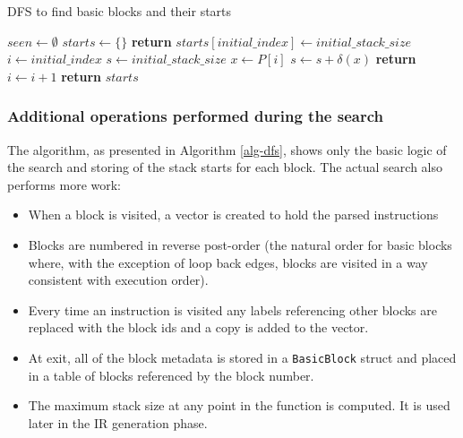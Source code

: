 \begin{algorithm}
      \caption{DFS to find basic blocks and their starts}\label{alg-dfs}
      \begin{algorithmic}[1]
            \State $seen \gets \emptyset$
            \State $starts \gets \{\}$
            \State \textbf{return}
            \EndIf
            \State $starts[initial\_index] \gets initial\_stack\_size$
            \State $i \gets initial\_index$
            \State $s \gets initial\_stack\_size$
            \Repeat
            \State $x \gets P[i]$
            \State $s \gets s + \delta(x)$
            \State {}
            \EndFor
            \State {}
            \EndIf
            \State \textbf{return}
            \EndIf
            \State $i \gets i + 1$
            \EndFunction
            \State {}
            \State \textbf{return} $starts$
            \EndFunction
      \end{algorithmic}
\end{algorithm}

\subsubsection{Additional operations performed during the search} \label{addop}

The algorithm, as presented in Algorithm \ref{alg-dfs}, shows only the basic logic of the search
and
storing of the stack starts for each block. The actual search also performs more work:

\begin{itemize}
      \item When a block is visited, a vector is created to hold the parsed instructions
      \item Blocks are numbered in reverse post-order (the natural order for basic blocks where,
            with the exception of loop back edges, blocks are visited in a way consistent with
            execution order).
      \item Every time an instruction is visited any labels referencing other blocks are replaced
            with the block ids and a copy is added to the vector.
      \item At exit, all of the block metadata is stored in a \texttt{BasicBlock} struct and placed
            in a table of blocks referenced by the block number.
      \item The maximum stack size at any point in the function is computed. It is used later in
            the IR generation phase.
\end{itemize}

